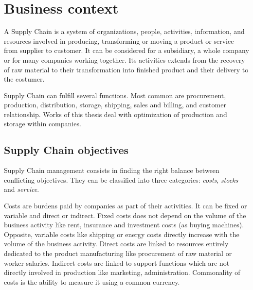 \chapter{Business context}
\label{chap:business-context}


A Supply Chain is a system of organizations, people, activities, information, and resources involved in producing, transforming or moving a product or service from supplier to customer.
It can be considered for a subsidiary, a whole company or for many companies working together.
Its activities extends from the recovery of raw material to their transformation into finished product and their delivery to the costumer.

Supply Chain can fulfill several functions.
Most common are procurement, production, distribution, storage, shipping, sales and billing, and customer relationship.
Works of this thesis deal with optimization of production and storage within companies.


\section{Supply Chain objectives}



Supply Chain management consists in finding the right balance between conflicting objectives.
They can be classified into three categories: \emph{costs}, \emph{stocks} and \emph{service}.


Costs are burdens paid by companies as part of their activities.
It can be fixed or variable and direct or indirect.
Fixed costs does not depend on the volume of the business activity like rent, insurance and investment costs (as buying machines).
Opposite, variable costs like shipping or energy costs directly increase with the volume of the business activity.
Direct costs are linked to resources entirely dedicated to the product manufacturing like procurement of raw material or worker salaries.
Indirect costs are linked to support functions which are not directly involved in production like marketing, administration.
Commonality of costs is the ability to measure it using a common currency.


